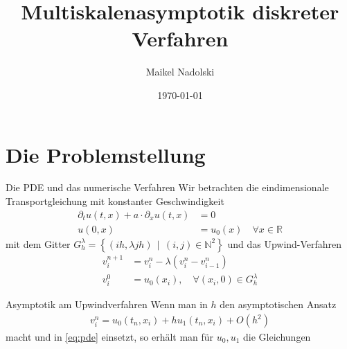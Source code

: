 \documentclass{beamer}
\title{Multiskalenasymptotik diskreter Verfahren}
\date{\today}
\author{Maikel Nadolski}
\institute{Freie Universität Berlin}
\newcommand{\R}{\mathbb R}
\newcommand{\N}{\mathbb N}
\begin{document}
  \maketitle
  \section{Die Problemstellung}

  \begin{frame}{Die PDE und das numerische Verfahren}
    Wir betrachten die eindimensionale Transportgleichung mit konstanter 
    Geschwindigkeit
    \begin{align}\label{eq:pde}
      \partial_t u(t,x) + a \cdot \partial_x u(t,x) &= 0\\
      u(0,x) &= u_0(x) \quad \forall x \in \R
    \end{align}
    mit dem Gitter
    $G^\lambda_h = \left\{ (ih, \lambda jh) \, \mid \, (i,j) \in \N^2 \right\}$
    und das Upwind-Verfahren
    \begin{align}
      v^{n+1}_i &= v^n_i - \lambda ( v^n_i - v^n_{i-1} )\\
      v^0_i &= u_0(x_i), \quad \forall (x_i, 0) \in G^\lambda_h
    \end{align}
  \end{frame}

  \begin{frame}{Asymptotik am Upwindverfahren}
    Wenn man in $h$ den asymptotischen Ansatz 
    \begin{align}
      v^n_i = u_0(t_n, x_i) + h u_1(t_n, x_i) + O(h^2)
    \end{align}
    macht und in \eqref{eq:pde} einsetzt, so erhält man für $u_0, u_1$ die Gleichungen
  \end{frame}
\end{document}
